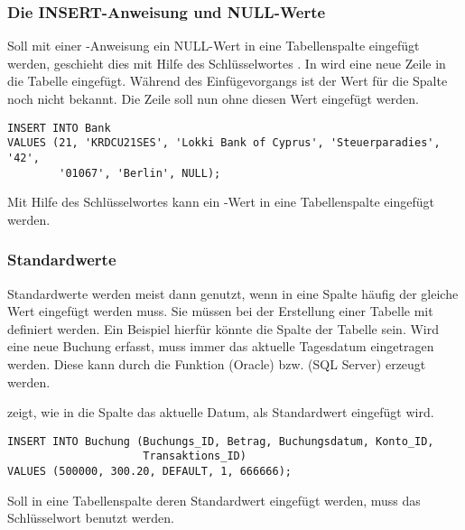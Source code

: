         \subsubsection{Die INSERT-Anweisung und NULL-Werte}
          Soll mit einer \INSERT-Anweisung ein NULL-Wert in eine Tabellenspalte
          eingef\"ugt werden, geschieht dies mit Hilfe des Schl\"usselwortes
          . In  wird eine neue Zeile in
          die Tabelle  eingef\"ugt. W\"ahrend des
          Einf\"ugevorgangs ist der Wert f\"ur die Spalte 
          noch nicht bekannt. Die Zeile soll nun ohne diesen Wert eingef\"ugt
          werden.
        \begin{lstlisting}[language=oracle_sql,caption={Ein einfaches \INSERT{} mit \languageorasql{NULL}-Werten},label=sql07_05]
INSERT INTO Bank
VALUES (21, 'KRDCU21SES', 'Lokki Bank of Cyprus', 'Steuerparadies', '42',
        '01067', 'Berlin', NULL);
        \end{lstlisting}
        \begin{merke}
          Mit Hilfe des Schl\"usselwortes  kann ein
          -Wert in eine Tabellenspalte eingef\"ugt werden.
        \end{merke}
        \subsubsection{Standardwerte}
          \label{defaultvalues}
          Standardwerte werden meist dann genutzt, wenn in eine Spalte h\"aufig
          der gleiche Wert eingef\"ugt werden muss. Sie m\"ussen bei der
          Erstellung einer Tabelle mit definiert werden. Ein Beispiel hierf\"ur
          k\"onnte die Spalte  der Tabelle
           sein. Wird eine neue Buchung erfasst, muss immer
          das aktuelle Tagesdatum eingetragen werden. Diese kann durch die
          Funktion  (Oracle) bzw.
           (SQL Server) erzeugt werden.

           zeigt, wie in die Spalte
           das aktuelle Datum, als Standardwert
          eingef\"ugt wird.
          \begin{lstlisting}[language=oracle_sql,caption={Einf\"ugen eines Standardwertes},label=sql07_06]
INSERT INTO Buchung (Buchungs_ID, Betrag, Buchungsdatum, Konto_ID,
                     Transaktions_ID)
VALUES (500000, 300.20, DEFAULT, 1, 666666);
          \end{lstlisting}
          \begin{merke}
            Soll in eine Tabellenspalte deren Standardwert eingef\"ugt werden,
            muss das Schl\"usselwort  benutzt werden.
          \end{merke}
